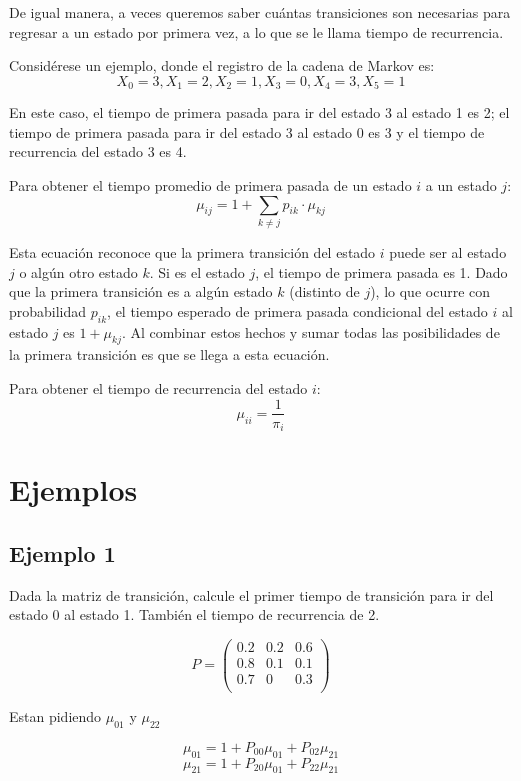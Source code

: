 \documentclass{article}
\begin{document}
De igual manera, a veces queremos saber cuántas transiciones son necesarias para regresar a un estado por primera vez, a lo que se le llama tiempo de recurrencia.

Considérese un ejemplo, donde el registro de la cadena de Markov es:
\[ X_0 = 3, X_1 = 2, X_2 = 1, X_3 = 0, X_4 = 3, X_5 = 1 \]

En este caso, el tiempo de primera pasada para ir del estado 3 al estado 1 es 2; el tiempo de primera pasada para ir del estado 3 al estado 0 es 3 y el tiempo de recurrencia del estado 3 es 4.

Para obtener el tiempo promedio de primera pasada de un estado \( i \) a un estado \( j \):
\[ \mu_{ij} = 1 + \sum_{k \neq j} p_{ik} \cdot \mu_{kj} \]

Esta ecuación reconoce que la primera transición del estado \( i \) puede ser al estado \( j \) o algún otro estado \( k \). Si es el estado \( j \), el tiempo de primera pasada es 1. Dado que la primera transición es a algún estado \( k \) (distinto de \( j \)), lo que ocurre con probabilidad \( p_{ik} \), el tiempo esperado de primera pasada condicional del estado \( i \) al estado \( j \) es \( 1 + \mu_{kj} \). Al combinar estos hechos y sumar todas las posibilidades de la primera transición es que se llega a esta ecuación.

Para obtener el tiempo de recurrencia del estado \( i \):
\[ \mu_{ii} = \frac{1}{\pi_i} \]
\newpage
\section*{Ejemplos}

\subsection*{Ejemplo 1}
Dada la matriz de transición, calcule el primer tiempo de transición para ir del estado 0 al estado 1. También el tiempo de recurrencia de 2.

\[
    P = \begin{pmatrix}
        0.2 & 0.2 & 0.6 \\
        0.8 & 0.1 & 0.1 \\
        0.7 & 0   & 0.3 \\
    \end{pmatrix}
\]

Estan pidiendo $\mu_{01}$ y $\mu_{22}$

\[\mu_{01} = 1 + P_{00}\mu_{01} + P_{02}\mu_{21}\]
\[\mu_{21} = 1 + P_{20}\mu_{01} + P_{22}\mu_{21}\]
\end{document}
